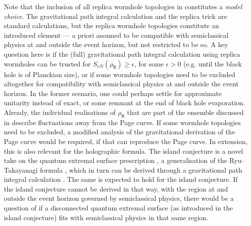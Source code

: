 \documentclass[12pt]{article}
\numberwithin{equation}{section}
\begin{document}
Note that the inclusion of all replica wormhole topologies in \cite{Penington:2019kki,Almheiri:2019qdq} constitutes a \emph{model choice}. The gravitational path integral calculation and the replica trick are standard calculations, but the replica wormhole topologies constitute an introduced element --- a priori assumed to be compatible with semiclassical physics at and outside the event horizon, but not restricted to be so. A key question here is if the (full) gravitational path integral calculation using replica wormholes can be trusted for $S_{vN}(\rho_\textsf{R})\geq\epsilon$, for some $\epsilon>0$ (e.g. until the black hole is of Planckian size), or if some wormhole topologies need to be excluded altogether for compatibility with semiclassical physics at and outside the event horizon. In the former scenario, one could perhaps settle for approximate unitarity instead of exact, or some remnant at the end of black hole evaporation. Already, the individual realisations of $\rho_\textsf{R}$ that are part of the ensemble discussed in \cite{Penington:2019kki} describe fluctuations away from the Page curve. If some wormhole topologies need to be excluded, a modified analysis of the gravitational derivation of the Page curve would be required, if that can reproduce the Page curve. In extension, this is also relevant for the holographic formula. The island conjecture is a novel take on the quantum extremal surface prescription \cite{Engelhardt:2014gca}, a generalisation of the Ryu--Takayanagi formula \cite{Ryu:2006bv,Hubeny:2007xt}, which in turn can be derived through a gravitational path integral calculation \cite{Lewkowycz:2013nqa,Faulkner:2013ana,Dong:2016hjy,Dong:2017xht}. The same is expected to hold for the island conjecture. If the island conjecture cannot be derived in that way, with the region at and outside the event horizon governed by semiclassical physics, there would be a question of if a disconnected quantum extremal surface (as introduced in the island conjecture) fits with semiclassical physics in that same region.
\end{document}
